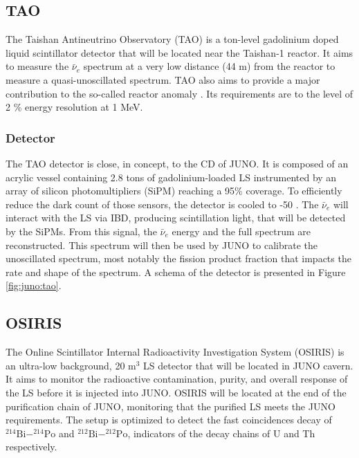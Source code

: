 \documentclass[../main.tex]{subfiles}
\begin{document}
\subsection{TAO}
\label{sec:juno:tao}
The Taishan Antineutrino Observatory (TAO) \cite{juno_collaboration_tao_2020, steiger_tao_2022} is a ton-level gadolinium doped liquid scintillator detector that will be located near the Taishan-1 reactor. It aims to measure the $\bar{\nu}_e$ spectrum at a very low distance (44 m) from the reactor to measure a quasi-unoscillated spectrum. TAO also aims to provide a major contribution to the so-called reactor anomaly \cite{mention_reactor_2011}. Its requirements are to the level of 2 \% energy resolution at 1 MeV.

\subsubsection{Detector}

The TAO detector is close, in concept, to the CD of JUNO. It is composed of an acrylic vessel containing 2.8 tons of gadolinium-loaded LS instrumented by an array of silicon photomultipliers (SiPM) reaching a 95\% coverage. To efficiently reduce the dark count of those sensors, the detector is cooled to -50 \textcelsius.
The $\bar{\nu}_e$ will interact with the LS via IBD, producing scintillation light, that will be detected by the SiPMs. From this signal, the $\bar{\nu}_e$ energy and the full spectrum are reconstructed.
This spectrum will then be used by JUNO to calibrate the unoscillated spectrum, most notably the fission product fraction that impacts the rate and shape of the spectrum. A schema of the detector is presented in Figure \ref{fig:juno:tao}.

\subsection{OSIRIS}
\label{sec:juno:OSIRIS}
The Online Scintillator Internal Radioactivity Investigation System (OSIRIS) \cite{juno_collaboration_design_2021} is an ultra-low background, 20 m$^3$ LS detector that will be located in JUNO cavern. It aims to monitor the radioactive contamination, purity, and overall response of the LS before it is injected into JUNO.
OSIRIS will be located at the end of the purification chain of JUNO, monitoring that the purified LS meets the JUNO requirements. The setup is optimized to detect the fast coincidences decay of $^{214}\mathrm{Bi}-^{214}\mathrm{Po}$ and $^{212}\mathrm{Bi}-^{212}\mathrm{Po}$, indicators of the decay chains of U and Th respectively.
\end{document}

